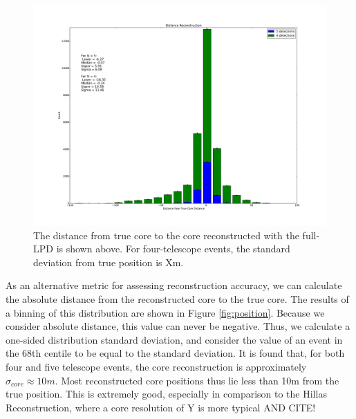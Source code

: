 \documentclass[11pt]{article}
\begin{document}
\begin{figure}
\begin{center}
\includegraphics[width=\textwidth]{coredistance}
\caption{The distance from true core to the core reconstructed with the full-LPD is shown above. For four-telescope events, the standard deviation from true position is Xm. }
\label{fig:coredistance}
\end{center}
\end{figure}

As an alternative metric for assessing reconstruction accuracy, we can calculate the absolute distance from the reconstructed core to the true core. The results of a binning of this distribution are shown in Figure \ref{fig:position}. Because we consider absolute distance, this value can never be negative. Thus, we calculate a one-sided distribution standard deviation, and consider the value of an event in the 68th centile to be equal to the standard deviation. It is found that, for both four and five telescope events, the core reconstruction is approximately $\sigma_{core} \approx 10m$. Most reconstructed core positions thus lie less than 10m from the true position. This is extremely good, especially in comparison to the Hillas Reconstruction, where a core resolution of Y is more typical AND CITE!
\end{document}
